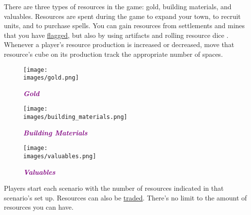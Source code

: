 There are three types of resources in the game: gold, building materials, and valuables.
Resources are spent during the game to expand your town, to recruit units, and to purchase spells.
You can gain resources from settlements and mines that you have \hyperlink{Categories}{flagged}, but also by using artifacts and rolling resource dice .
Whenever a player's resource production is increased or decreased, move that resource's cube on its production track the appropriate number of spaces.\par
\begin{figure}[h]
  \centering
    \centering
    \texttt{[image: \\images/gold.png]}
    \caption{{\textit{\textbf{\textcolor{purple}{Gold}}}}}
  \endminipage
    \centering
    \texttt{[image: \\images/building\_materials.png]}
    \caption{{\textit{\textbf{{\textcolor{purple}{Building Materials}}}}}}
  \endminipage
    \centering
    \texttt{[image: \\images/valuables.png]}
    \caption{{\textit{\textbf{{\textcolor{purple}{Valuables}}}}}}
  \endminipage
\end{figure}
Players start each scenario with the number of resources indicated in that scenario’s set up.
Resources can also be \hyperlink{Trading}{traded}.
There's no limit to the amount of resources you can have.
